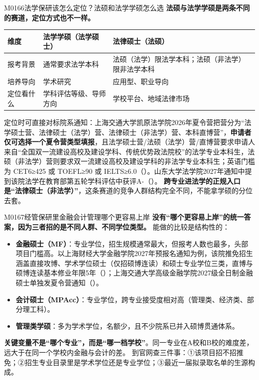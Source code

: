 \begin{qa}{M0166}{法学保研该怎么定位？法硕和法学学硕怎么选}
\textbf{法硕与法学学硕是两条不同的赛道，定位方式也不一样。}
\par\vspace{2pt}\nobreak\begin{center}\footnotesize
\begin{tabularx}{\textwidth}{>{\raggedright\arraybackslash}X>{\raggedright\arraybackslash}X>{\raggedright\arraybackslash}X}
\toprule
\textbf{维度} & \textbf{法学学硕（法学硕士）} & \textbf{法律硕士（法硕）} \\ \midrule
报考背景 & 通常要求法学本科 & 法硕（法学）限法学本科；法硕（非法学）限非法学本科 \\
培养导向 & 学术研究 & 应用型、职业导向 \\
定位看什么 & 学科评估等级、导师方向 & 学校平台、地域法律市场 \\
\bottomrule
\end{tabularx}
\end{center}\vspace{2pt}\par

定位时可直接对标院系通知：上海交通大学凯原法学院2026年夏令营把营分为“法学硕士营、法律硕士（法学）营、法律硕士（非法学）营、本科直博营”，\textbf{申请者仅可选择一个夏令营类型填报}，且法学硕士营/法硕（法学）营/直博营要求申请人来自“全国双一流建设高校及建设学科、传统优势政法院校”的法学专业本科生，法硕（非法学）营则要求双一流建设高校及建设学科的非法学专业本科生；英语门槛为 CET6≥425 或 TOEFL≥90 或 IELTS≥6.0（）。山东大学法学院2027年通知中提到该院法学在教育部第五轮学科评估中获评A-（）。
\textbf{跨专业进法学的正规入口是“法律硕士（非法学）”}，这条赛道的竞争人群结构完全不同，不能拿学硕的分位去套。
\end{qa}

\begin{qa}{M0167}{经管保研里金融会计管理哪个更容易上岸}
\textbf{没有“哪个更容易上岸”的统一答案，因为三者招的是不同人群、不同学位类型。} 能做的比较是结构性的：
\begin{itemize}
  \item \textbf{金融硕士（MF）}：专业学位，招生规模通常最大，但报考人数也最多，头部项目门槛高。以上海财经大学金融学院2027年预报名通知为例，该院推免招生涵盖直接攻博、学术学位硕士（仅招硕博连读）和硕士专业学位三类，直博与硕博连读基本修业年限5年（）；上海交通大学高级金融学院2027级全日制金融硕士单独发夏令营通知（）。
  \item \textbf{会计硕士（MPAcc）}：专业学位，跨专业接受度相对高（管理类、经济类、部分理工科）。
  \item \textbf{管理类学硕}：多为学术学位，名额少，且不少院系已并入硕博贯通体系。
\end{itemize}
\textbf{关键变量不是“哪个专业”，而是“哪一档学校”}。同一专业在A校和B校的难度差，远大于在同一个学校内金融与会计的差。
到官网查三件事：①该项目招不招推免；②招生专业目录里是学术学位还是专业学位；③最近一届拟录取名单的生源构成。
\end{qa}

